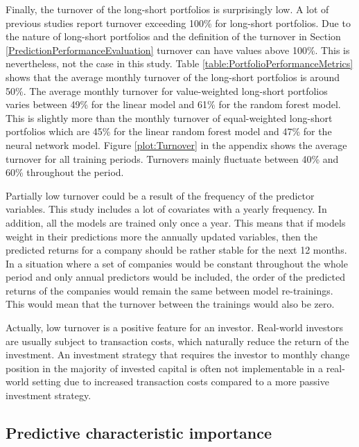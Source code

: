 \documentclass[12pt]{article}
\begin{document}
Finally, the turnover of the long-short portfolios is surprisingly low. A lot of previous studies report turnover exceeding 100\% for long-short portfolios.\footnotemark {} Due to the nature of long-short portfolios and the definition of the turnover in Section \ref{PredictionPerformanceEvaluation} turnover can have values above 100\%. This is nevertheless, not the case in this study. Table \ref{table:PortfolioPerformanceMetrics} shows that the average monthly turnover of the long-short portfolios is around 50\%. The average monthly turnover for value-weighted long-short portfolios varies between 49\% for the linear model and 61\% for the random forest model. This is slightly more than the monthly turnover of equal-weighted long-short portfolios which are 45\% for the linear random forest model and 47\% for the neural network model. Figure \ref{plot:Turnover} in the appendix shows the average turnover for all training periods. Turnovers mainly fluctuate between 40\% and 60\% throughout the period. \par

Partially low turnover could be a result of the frequency of the predictor variables. This study includes a lot of covariates with a yearly frequency. In addition, all the models are trained only once a year. This means that if models weight in their predictions more the annually updated variables, then the predicted returns for a company should be rather stable for the next 12 months. In a situation where a set of companies would be constant throughout the whole period and only annual predictors would be included, the order of the predicted returns of the companies would remain the same between model re-trainings. This would mean that the turnover between the trainings would also be zero. \par

Actually, low turnover is a positive feature for an investor. Real-world investors are usually subject to transaction costs, which naturally reduce the return of the investment. An investment strategy that requires the investor to monthly change position in the majority of invested capital is often not implementable in a real-world setting due to increased transaction costs compared to a more passive investment strategy. \par

\subsection{Predictive characteristic importance}\label{PredictiveCharacteristicImportance}
\end{document}
